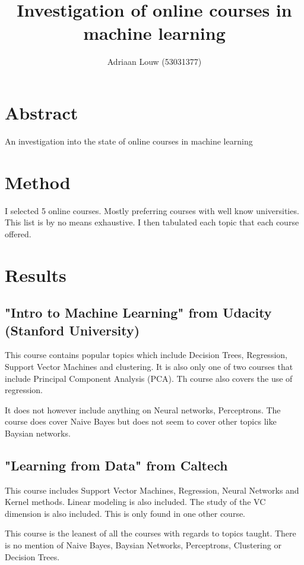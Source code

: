 \documentclass[10pt,a4paper]{article}
\title{Investigation of online courses in machine learning}
\author{ Adriaan Louw (53031377)}
\begin{document}
\maketitle

\tableofcontents

\section{Abstract}
An investigation into the state of online courses in machine learning

\section{Method}
I selected 5 online courses. Mostly preferring courses with well know universities. This list is by no means exhaustive. I then tabulated each topic that each course offered.

\section{Results}

\subsection{"Intro to Machine Learning" from Udacity (Stanford University)}

This course contains popular topics which include Decision Trees, Regression, Support Vector Machines and clustering. It is also only one of two courses that include Principal Component Analysis (PCA). Th course also covers the use of regression.

It does not however include anything on Neural networks, Perceptrons. The course does cover Naive Bayes but does not seem to cover other topics like Baysian networks. \citep{stan}

\subsection{"Learning from Data" from Caltech }

This course includes Support Vector Machines, Regression, Neural Networks and Kernel methods. Linear modeling is also included. The study of the VC dimension is also included. This is only found in one other course.

This course is the leanest of all the courses with regards to topics taught. There is no mention of Naive Bayes, Baysian Networks, Perceptrons, Clustering or Decision Trees. \citep{cal}
\end{document}
